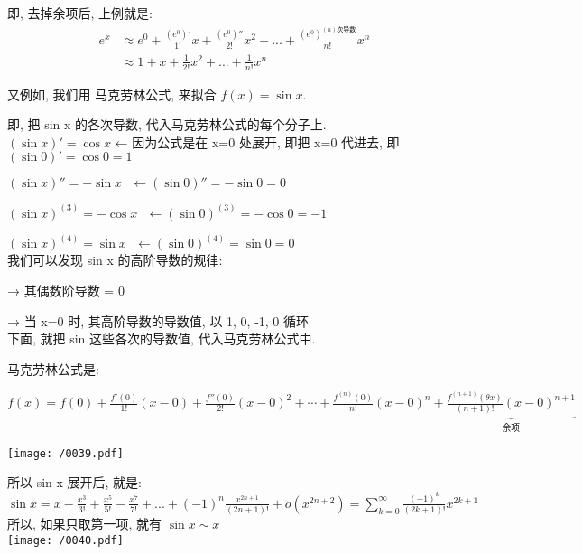 \documentclass[UTF8]{ctexart}
\begin{document}
即, 去掉余项后, 上例就是: 
\begin{align*}  %
	e^x & \approx e^0+\frac{\left( e^0 \right) '}{1!}x+\frac{\left( e^0 \right) ''}{2!}x^2+...+\frac{\left( e^0 \right) ^{\left( n \right) \text{次导数}}}{n!}x^n\\
	& \approx 1+x+\frac{1}{2!}x^2+...+\frac{1}{n!}x^n  
\end{align*}



\begin{myEnvSample}
	又例如, 我们用 马克劳林公式, 来拟合 $ f(x) = \sin x$.
	
	即, 把 sin x 的各次导数, 代入马克劳林公式的每个分子上. \\ 
	
	$\left( \sin x \right) '=\cos x$ ← 因为公式是在 x=0 处展开, 即把 x=0 代进去, 即 $\left( \sin 0 \right) '=\cos 0=1$
	
	$\left( \sin x \right) ''=-\sin x\ \ \ \gets \left( \sin 0 \right) ''=-\sin 0=0$
	
	$\left( \sin x \right) ^{\left( 3 \right)}=-\cos x\ \ \ \gets \left( \sin 0 \right) ^{\left( 3 \right)}=-\cos 0=-1$
	
	$\left( \sin x \right) ^{\left( 4 \right)}=\sin x\ \ \ \gets \left( \sin 0 \right) ^{\left( 4 \right)}=\sin 0=0$ \\
	
	我们可以发现 sin x 的高阶导数的规律:  
	
	→ 其偶数阶导数 = 0
	
	→ 当 x=0 时, 其高阶导数的导数值, 以 1, 0, -1, 0 循环 \\
	
	下面, 就把 sin 这些各次的导数值, 代入马克劳林公式中.
	
	马克劳林公式是: 
	
	$ f\left( x \right) =f\left( 0 \right) +\frac{f'\left( 0 \right)}{1!}\left( x-0 \right) +\frac{f''\left( 0 \right)}{2!}\left( x-0 \right) ^2+\cdots +\frac{f^{\left( n \right)}\left( 0 \right)}{n!}\left( x-0 \right) ^n+\underset{\text{余项}}{\underbrace{\frac{f^{\left( n+1 \right)}\left( \theta x \right)}{\left( n+1 \right) !}\left( x-0 \right) ^{n+1}}}	$
	
	\texttt{[image: /0039.pdf]}
	
	所以 sin x 展开后, 就是: \\
	
	$\sin x=x-\frac{x^3}{3!}+\frac{x^5}{5!}-\frac{x^7}{7!}+...+\left( -1 \right) ^n\frac{x^{2n+1}}{\left( 2n+1 \right) !}+o\left( x^{2n+2} \right) =\sum_{k=0}^{\infty}{\frac{\left( -1 \right) ^k}{\left( 2k+1 \right) !}x^{2k+1}}
	 $ \\
	
	所以, 如果只取第一项, 就有 $ \sin x \sim x$ \\
	
	\texttt{[image: /0040.pdf]}
	
\end{myEnvSample}
\end{document}
